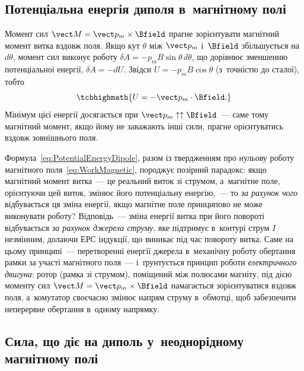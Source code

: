 \subsection*{Потенціальна енергія диполя в~магнітному полі}


Момент сил $\vect M = \vect p_m\times\Bfield$ прагне зорієнтувати магнітний момент витка
вздовж поля. Якщо кут $\theta$ між $\vect p_m$ і~$\Bfield$ збільшується на $d\theta$,
момент сил виконує роботу $\delta A = -p_mB\sin\theta\, d\theta$, що дорівнює зменшенню
потенціальної енергії, $\delta A = -dU$. Звідси $U = -p_mB\cos\theta$ (з~точністю до
сталої), тобто
\begin{equation}\label{eq:PotentialEnergyDipole}
	\tcbhighmath{
		U = -\vect p_m\cdot\Bfield.
	}
\end{equation}
Мінімум цієї енергії досягається при $\vect p_m\uparrow\uparrow \Bfield$~--- саме тому
магнітний момент, якщо йому не заважають інші сили, прагне орієнтуватись вздовж
зовнішнього поля.

\begin{Attention}
	Формула~\eqref{eq:PotentialEnergyDipole}, разом із твердженням про нульову роботу
	магнітного поля~\eqref{eq:WorkMagnetic}, породжує позірний парадокс: якщо магнітний
	момент витка~--- це реальний виток зі струмом, а~магнітне поле, орієнтуючи цей виток,
	змінює його потенціальну енергію,~--- то \emph{за рахунок чого} відбувається ця зміна
	енергії, якщо магнітне поле принципово не може виконувати роботу? Відповідь~--- зміна
	енергії витка при його повороті відбувається \emph{за рахунок джерела струму}, яке
	підтримує в~контурі струм $I$ незмінним, долаючи ЕРС індукції, що виникає під час
	повороту витка. Саме на цьому принципі~--- перетворенні енергії джерела в~механічну
	роботу обертання рамки за участі магнітного поля~--- і~ґрунтується принцип роботи
	\emph{електричного двигуна}: ротор (рамка зі струмом), поміщений між полюсами
	магніту, під дією моменту сил $\vect M=\vect p_m\times\Bfield$ намагається
	зорієнтуватися вздовж поля, а~комутатор своєчасно змінює напрям струму в~обмотці, щоб
	забезпечити неперервне обертання в~одному напрямку.
\end{Attention}


\subsection*{Сила, що діє на диполь у~неоднорідному магнітному полі}


